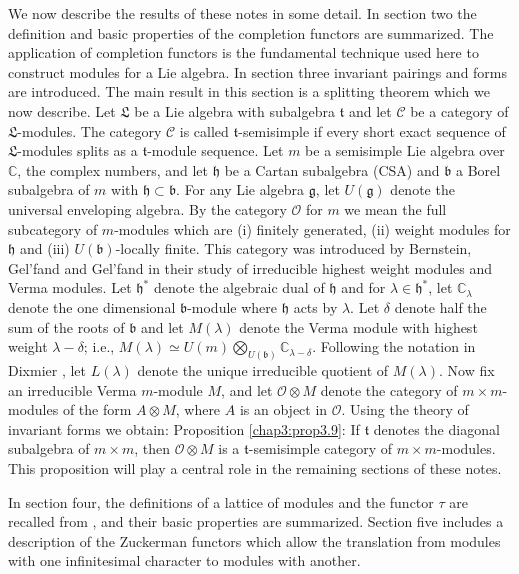 We now describe the results of these notes in some detail. In section
two the definition and basic properties of the completion functors are
summarized. The application of completion functors is the fundamental
technique used here to construct modules for a Lie algebra. In section
three invariant pairings and forms are introduced. The main result in
this section is a splitting theorem which we now describe. Let
$\mathfrak{L}$ be a Lie algebra with  subalgebra\pageoriginale
$\mathfrak{t}$ and let $\mathcal{C}$ be a category of
$\mathfrak{L}$-modules. The category $\mathcal{C}$ is called
$\mathfrak{t}$-semisimple if every short exact sequence of
$\mathfrak{L}$-modules splits as a $\mathfrak{t}$-module sequence. Let
$m$ be a semisimple Lie algebra over $\mathbb{C}$, the complex
numbers, and let $\mathfrak{h}$ be a Cartan subalgebra (CSA) and $\mathfrak{b}$ a
Borel subalgebra of $m$ with $\mathfrak{h} \subset \mathfrak{b}$. For any Lie
algebra $\mathfrak{g}$, let $U(\mathfrak{g})$ denote the universal
enveloping algebra. By the category $\mathscr{O}$ for $m$ we mean the
full subcategory of $m$-modules which are (i) finitely generated, (ii)
weight modules for $\mathfrak{h}$ and (iii) $U(\mathfrak{b})$-locally
finite. This category was introduced by Bernstein, Gel'fand and
Gel'fand \cite{key2} in their study of irreducible highest weight
modules and Verma modules. Let $\mathfrak{h}^*$ denote the algebraic
dual of $\mathfrak{h}$ and for $\lambda \in \mathfrak{h}^*$, let
$\mathbb{C}_\lambda$ denote the one dimensional $\mathfrak{b}$-module
where $\mathfrak{h}$ acts by $\lambda$. Let $\delta$ denote half the
sum of the roots of $\mathfrak{b}$ and let $M(\lambda)$ denote the
Verma module with highest weight $\lambda-\delta$; i.e., $M(\lambda)
\simeq U(m) \bigotimes\limits_{U(\mathfrak{b})} \mathbb{C}_{\lambda -
  \delta}$. Following the notation in Dixmier \cite{key8}, let
$L(\lambda)$ denote the unique irreducible quotient of
$M(\lambda)$. Now fix an irreducible Verma $m$-module $M$, and let
$\mathscr{O} \otimes M$ denote the category of $m \times m$-modules of
the form $A \otimes M$, where $A$ is an  object in
$\mathscr{O}$. Using the theory of invariant forms we obtain:
Proposition \ref{chap3:prop3.9}: If $\mathfrak{t}$ denotes the
diagonal subalgebra of 
$m \times m$, then $\mathscr{O} \otimes M$ is a
$\mathfrak{t}$-semisimple category of $m \times m$-modules. This
proposition will play a central role in the remaining sections of
these notes. 

In section four, the definitions of a lattice of modules and the
functor $\tau$ are recalled from \cite{key15}, and their basic
properties are summarized. Section five includes a description of the
Zuckerman functors which allow the translation from modules with one
infinitesimal character to modules with another. 


